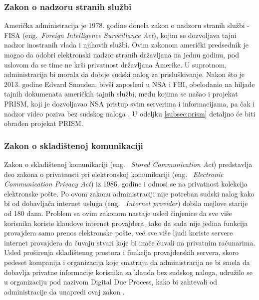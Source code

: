\documentclass[a4paper]{article}
\begin{document}
\subsubsection{Zakon o nadzoru stranih službi}
Američka administracija je 1978. godine donela zakon o nadzoru stranih službi - FISA (eng.~{\em Foreign Intelligence Surveillance Act}),  kojim se dozvoljava tajni nadzor inostranih vlada i njihovih službi. Ovim zakonom američki predsednik je mogao da odobri elektronski nadzor stranih državljana na jednu godinu, pod uslovom da se time ne krši privatnost državljana Amerike. U suprotnom, administracija bi morala da dobije sudski nalog za prisluškivanje. Nakon što je 2013. godine Edvard Snouden, bivši zaposleni u NSA i FBI, obelodanio na hiljade tajnih dokumenata američkih tajnih službi, među kojima se našao i projekat PRISM, koji je dozvoljavao NSA pristup svim serverima i informacijama, pa čak i nadzor video poziva bez sudskog naloga \cite{prism}. U odeljku \ref{subsec:prism} detaljno će biti obrađen projekat PRISM.

\subsubsection{Zakon o skladištenoj komunikaciji}
Zakon o skladištenoj komunikaciji (eng. ~{\em Stored Communication Act}) predstavlja deo zakona o privatnosti pri elektronskoj komunikaciji (eng. ~{\em Electronic Communication Privacy Act}) iz 1986. godine i odnosi se na privatnost kolekcija elektronske pošte. Po ovom zakonu administraciji nije potreban sudski nalog kako bi od dobavljača internet usluga (eng. ~{\em Internet provider})  dobila mejlove starije od 180 dana. Problem sa ovim zakonom nastaje usled činjenice da sve više korisnika koriste klaudove internet provajdera, tako da sada nije jedina funkcija provajdera samo prenos elektronske pošte, već sve više ljudi koriste servere internet provajdera da čuvaju stvari koje bi inače čuvali na privatnim računarima. Usled proširenja skladištenog prostora i funkcija provajderskih servera, skoro pedeset kompanija i organizacija koje smatraju da administracija ne bi smela da dobavlja privatne informacije korisnika sa klauda bez sudskog naloga, udružilo se u organizaciju pod nazivom Digital Due Process, kako bi zahtevali od administracije da unapredi ovaj zakon \cite{ddp}.
\end{document}
